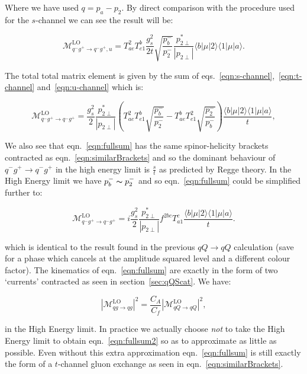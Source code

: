 		Where we have used $q=p_a-p_2$.  By direct comparison with the procedure used for the $s$-channel we can see the result will be:

		\begin{equation}
		\mathcal{M}_{q^-g^+\to q^-g^+, u}^{\text{LO}}=
		T^2_{ae}T^b_{e1}\frac{g_s^2}{2t}\sqrt{\frac{p_b^-}{p_2^-}}\frac{p^*_{2\perp}}{|p_{2\perp}|}\langle{b}|\mu|2\rangle\langle{1}|\mu|a\rangle.
		\label{eqn:u-channel}
		\end{equation}

		The total total matrix element is given by the sum of eqs.~\eqref{eqn:s-channel},~\eqref{eqn:t-channel} and~\eqref{eqn:u-channel} which is:

		\begin{equation}
			\mathcal{M}_{q^-g^+\to q^-g^+}^{\text{LO}}=
			\frac{g_s^2}{2}\frac{p_{2\perp}^*}{|p_{2\perp}|}\left(T^2_{ae}T^b_{e1}\sqrt{\frac{p_b^-}{p_2^-}}-T^b_{ae}T^2_{e1}
			\sqrt{\frac{p_2^-}{p_b^-}}\right)\frac{\langle{b}|\mu|2\rangle\langle{1}|\mu|a\rangle}{t},
			\label{eqn:fullsum}
		\end{equation}

		We also see that eqn.~\eqref{eqn:fullsum} has the same spinor-helicity brackets contracted as eqn.~\eqref{eqn:similarBrackets}
		and so the dominant behaviour of $q^-g^+\to q^-g^+$ in the high energy limit is $\frac{s}{t}$ as predicted by Regge theory.
		In the High Energy limit we have $p_b^-\thicksim p_2^-$ and so eqn.~\eqref{eqn:fullsum} could be simplified
		further to:

		\begin{equation}
			\mathcal{M}_{q^-g^+\to q^-g^+}^{\text{LO}}=i\frac{g_s^2}{2}\frac{p_{2\perp}^*}{|p_{2\perp}|}f^{2bc}T^c_{a1}
			\frac{\langle{b}|\mu|2\rangle\langle{1}|\mu|a\rangle}{t}.
			\label{eqn:fullsum2}
		\end{equation}

		which is identical to the result found in the previous $qQ\rightarrow qQ$ calculation (save for a phase which cancels
		at the amplitude squared level and a different colour factor). The kinematics of eqn.~\eqref{eqn:fullsum} are exactly in the form of two `currents' contracted as
		seen in section~\ref{sec:qQScat}.  We have:

		\begin{equation}
			|\mathcal{M}_{qg\to qg}^{\text{LO}}|^2 = \frac{C_A}{C_f} |\mathcal{M}_{qQ\to qQ}^{\text{LO}}|^2,
		\end{equation}

		in the High Energy limit. In practice we actually choose \emph{not} to take the High Energy limit to obtain
		eqn.~\eqref{eqn:fullsum2} so as to approximate as little as possible.  Even without this extra approximation
		eqn.~\eqref{eqn:fullsum} is still exactly the form of a $t$-channel gluon exchange as seen in
		eqn.~\eqref{eqn:similarBrackets}.

